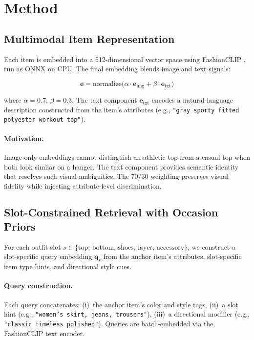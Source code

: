 \documentclass[10pt,twocolumn]{article}
\begin{document}
\section{Method}
\label{sec:method}

\subsection{Multimodal Item Representation}
\label{sec:embedding}

Each item is embedded into a 512-dimensional vector space using FashionCLIP
\citep{chia2022fashionclip}, run as ONNX on CPU.  The final embedding
blends image and text signals:

\begin{equation}
  \mathbf{e} = \text{normalize}\big(
    \alpha \cdot \mathbf{e}_{\text{img}} + \beta \cdot \mathbf{e}_{\text{txt}}
  \big)
\label{eq:blend}
\end{equation}

\noindent where $\alpha = 0.7$, $\beta = 0.3$.  The text component
$\mathbf{e}_{\text{txt}}$ encodes a natural-language description constructed
from the item's attributes (e.g., \texttt{"gray sporty fitted polyester
workout top"}).

\paragraph{Motivation.}
Image-only embeddings cannot distinguish an athletic top from a casual top
when both look similar on a hanger.  The text component provides semantic
identity that resolves such visual ambiguities.  The 70/30 weighting
preserves visual fidelity while injecting attribute-level discrimination.

\subsection{Slot-Constrained Retrieval with Occasion Priors}
\label{sec:retrieval}

For each outfit slot $s \in \{\text{top, bottom, shoes, layer, accessory}\}$,
we construct a slot-specific query embedding $\mathbf{q}_s$ from the anchor
item's attributes, slot-specific item type hints, and directional style cues.

\paragraph{Query construction.}
Each query concatenates: (i)~the anchor item's color and style tags,
(ii)~a slot hint (e.g., \texttt{"women's skirt, jeans, trousers"}), (iii)~a
directional modifier (e.g., \texttt{"classic timeless polished"}).  Queries
are batch-embedded via the FashionCLIP text encoder.
\end{document}
